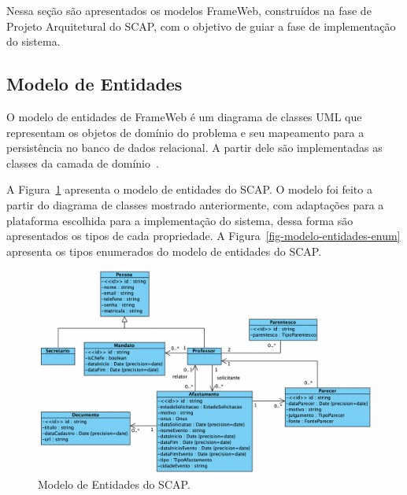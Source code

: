 Nessa seção são apresentados os modelos FrameWeb, construídos na fase de Projeto Arquitetural
do SCAP, com o objetivo de guiar a fase de implementação do sistema.

\subsection{Modelo de Entidades}
\label{subsec-frameweb-entidades}
O modelo de entidades de FrameWeb é um diagrama de classes UML que representam
os objetos de domínio do problema e seu mapeamento para a persistência no banco de dados
relacional. A partir dele são implementadas as classes da camada de domínio~\cite{souza:2007}.

A Figura~\ref{fig-modelo-entidades} apresenta o modelo de entidades do SCAP. O modelo foi feito
a partir do diagrama de classes mostrado anteriormente, com adaptações para a plataforma 
escolhida para a implementação do sistema, dessa forma são apresentados os tipos
de cada propriedade. A Figura~\ref{fig-modelo-entidades-enum} apresenta
os tipos enumerados do modelo de entidades do SCAP.

\begin{figure}
    \centering
    \includegraphics[width=1\textwidth]{figuras/fig-modelo-entidades.png}
    \caption{Modelo de Entidades do SCAP.}
    \label{fig-modelo-entidades}
\end{figure}


